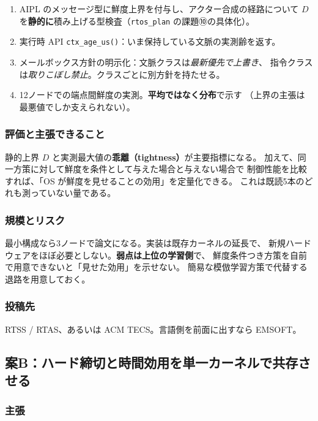 \documentclass[11pt,a4paper]{article}
\newcommand{\code}[1]{\texttt{#1}}
\newcommand{\prob}[1]{\textbf{\textcolor{red!55!black}{#1}}}
\newcommand{\keyp}[1]{\textbf{\textcolor{blue!45!black}{#1}}}
\begin{document}
\begin{enumerate}[leftmargin=1.6em,itemsep=2pt]
  \item AIPL のメッセージ型に鮮度上界を付与し、アクター合成の経路について
        $D$ を\keyp{静的に}積み上げる型検査（\code{rtos\_plan} の課題⑩の具体化）。
  \item 実行時 API \code{ctx\_age\_us()}：いま保持している文脈の実測齢を返す。
  \item メールボックス方針の明示化：文脈クラスは\emph{最新優先で上書き}、
        指令クラスは\emph{取りこぼし禁止}。クラスごとに別方針を持たせる。
  \item 12ノードでの端点間鮮度の実測。\keyp{平均ではなく分布}で示す
        （上界の主張は最悪値でしか支えられない）。
\end{enumerate}

\subsubsection*{評価と主張できること}

静的上界 $D$ と実測最大値の\keyp{乖離（tightness）}が主要指標になる。
加えて、同一方策に対して鮮度を条件として与えた場合と与えない場合で
制御性能を比較すれば、「OS が鮮度を見せることの効用」を定量化できる。
これは既読5本のどれも測っていない量である。

\subsubsection*{規模とリスク}

最小構成なら3ノードで論文になる。実装は既存カーネルの延長で、
新規ハードウェアをほぼ必要としない。\prob{弱点は上位の学習側}で、
鮮度条件つき方策を自前で用意できないと「見せた効用」を示せない。
簡易な模倣学習方策で代替する退路を用意しておく。

\subsubsection*{投稿先}

RTSS / RTAS、あるいは ACM TECS。言語側を前面に出すなら EMSOFT。

\subsection{案B：ハード締切と時間効用を単一カーネルで共存させる}

\subsubsection*{主張}
\end{document}
